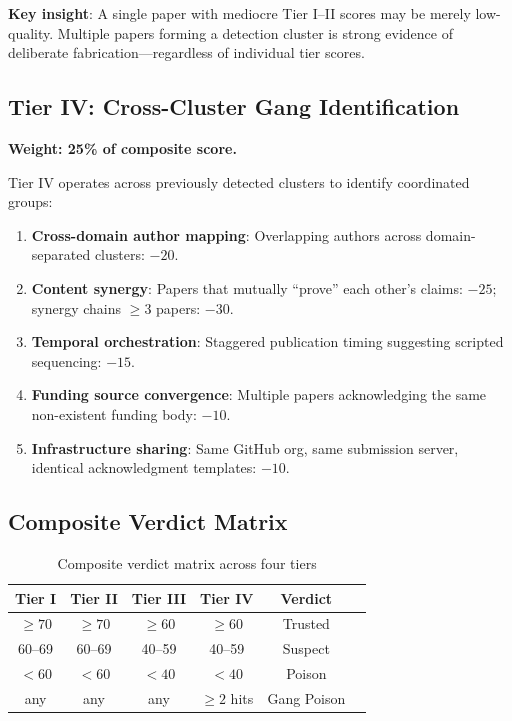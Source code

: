 \documentclass[11pt]{article}
\begin{document}
\textbf{Key insight}: A single paper with mediocre Tier I--II scores may be merely 
low-quality. Multiple papers forming a detection cluster is strong evidence of 
deliberate fabrication---regardless of individual tier scores.

\subsection{Tier IV: Cross-Cluster Gang Identification}

\textbf{Weight: 25\% of composite score.}

Tier IV operates across previously detected clusters to identify coordinated groups:

\begin{enumerate}
  \item \textbf{Cross-domain author mapping}: Overlapping authors across domain-separated 
    clusters: $-20$.
  \item \textbf{Content synergy}: Papers that mutually ``prove'' each other's claims: $-25$; 
    synergy chains $\geq 3$ papers: $-30$.
  \item \textbf{Temporal orchestration}: Staggered publication timing suggesting scripted 
    sequencing: $-15$.
  \item \textbf{Funding source convergence}: Multiple papers acknowledging the same 
    non-existent funding body: $-10$.
  \item \textbf{Infrastructure sharing}: Same GitHub org, same submission server, identical 
    acknowledgment templates: $-10$.
\end{enumerate}

\subsection{Composite Verdict Matrix}

\begin{table}[h]
\centering
\caption{Composite verdict matrix across four tiers}
\begin{tabular}{ccccc|c}
\toprule
Tier I & Tier II & Tier III & Tier IV & Verdict \\
\midrule
$\geq 70$ & $\geq 70$ & $\geq 60$ & $\geq 60$ & Trusted \\
60--69 & 60--69 & 40--59 & 40--59 & Suspect \\
$< 60$ & $< 60$ & $< 40$ & $< 40$ & Poison \\
any & any & any & $\geq 2$ hits & Gang Poison \\
\bottomrule
\end{tabular}
\end{table}
\end{document}
